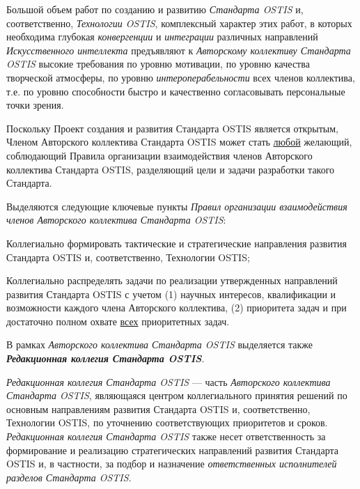 Большой объем работ по созданию и развитию \textit{Стандарта OSTIS} и, соответственно, \textit{Технологии OSTIS}, комплексный характер этих работ, в которых необходима глубокая \textit{конвергенции} и \textit{интеграции} различных направлений \textit{Искусственного интеллекта} предъявляют к \textit{Авторскому коллективу Стандарта OSTIS}  высокие требования по уровню мотивации, по уровню качества творческой атмосферы, по уровню \textit{интероперабельности} всех членов коллектива, т.е. по уровню способности быстро и качественно согласовывать персональные точки зрения.

Поскольку Проект создания и развития Стандарта OSTIS является открытым, Членом Авторского коллектива Стандарта OSTIS может стать \uline{любой} желающий, соблюдающий Правила организации взаимодействия членов Авторского коллектива Стандарта OSTIS, разделяющий цели и задачи разработки такого Стандарта.

Выделяются следующие ключевые пункты \textit{Правил организации взаимодействия членов Авторского коллектива Стандарта OSTIS}:
\begin{textitemize}
	\item Коллегиально формировать тактические и стратегические направления развития Стандарта OSTIS и, соответственно, Технологии OSTIS;
	\item Коллегиально распределять задачи по реализации утвержденных направлений развития Стандарта OSTIS с учетом (1) научных интересов, квалификации и возможности каждого члена Авторского коллектива, (2) приоритета задач и при достаточно полном охвате \uline{всех} приоритетных задач.
\end{textitemize}

В рамках \textit{Авторского коллектива Стандарта OSTIS} выделяется также \textit{\textbf{Редакционная коллегия Стандарта OSTIS}}. 

\textit{Редакционная коллегия Стандарта OSTIS} --- часть \textit{Авторского коллектива Стандарта OSTIS}, являющаяся центром коллегиального принятия решений по основным направлениям развития Стандарта OSTIS и, соответственно, Технологии OSTIS, по уточнению соответствующих приоритетов и сроков. \textit{Редакционная коллегия Стандарта OSTIS} также несет ответственность за формирование и реализацию стратегических направлений развития Стандарта OSTIS и, в частности, за подбор и назначение \textit{ответственных исполнителей разделов Стандарта OSTIS}.

